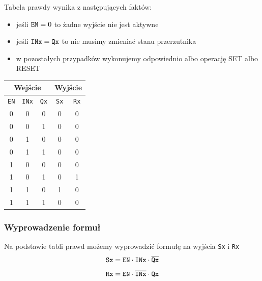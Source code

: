 \documentclass[a4paper]{article}
\begin{document}
Tabela prawdy wynika z następujących faktów:
\begin{itemize}
    \item jeśli $ \verb|EN| = 0 $ to żadne wyjście nie jest aktywne
    \item jeśli $ \verb|INx| = \verb|Qx| $ to nie musimy zmieniać stanu przerzutnika
    \item w pozostałych przypadków wykonujemy odpowiednio albo operację SET albo RESET
\end{itemize}

\begin{center}
    \begin{tabular}{|c|c|c||c|c|}
    \hline \multicolumn{3}{|c||}{Wejście} & \multicolumn{2}{|c|}{Wyjście} \\
    \hline \verb|EN| & \verb|INx| & \verb|Qx| &  \verb|Sx| & \verb|Rx| \\
    \hline 0 & 0 & 0 & 0 & 0 \\
    \hline 0 & 0 & 1 & 0 & 0 \\
    \hline 0 & 1 & 0 & 0 & 0 \\
    \hline 0 & 1 & 1 & 0 & 0 \\
    \hline 1 & 0 & 0 & 0 & 0 \\
    \hline 1 & 0 & 1 & 0 & 1 \\
    \hline 1 & 1 & 0 & 1 & 0 \\
    \hline 1 & 1 & 1 & 0 & 0 \\
    \hline 
    \end{tabular}
\end{center}

\subsubsection{Wyprowadzenie formuł}
Na podstawie tabli prawd możemy wyprowadzić formułę na wyjścia \verb|Sx| i \verb|Rx|
\[\verb|Sx| = \verb|EN| \cdot \verb|INx| \cdot \overline{\texttt{Qx}}\]
\[\verb|Rx| = \verb|EN| \cdot \overline{\texttt{INx}} \cdot \texttt{Qx}\]
\end{document}
